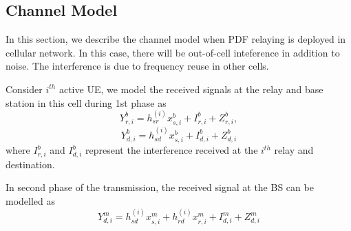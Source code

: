 \subsection{Channel Model}
In this section, we describe the channel model when PDF relaying is deployed in cellular network. In this case, there will be out-of-cell inteference in addition to noise. The interference is due to frequency reuse in other cells.
\par Consider $i^{th}$ active UE, we model the received signals at the relay and base station in this cell during 1st phase as
\begin{equation*}
Y_{r,i}^b = h^{(i)}_{sr}x_{s,i}^b + I_{r,i}^b + Z_{r,i}^b,
\end{equation*}
\begin{equation}
Y_{d,i}^b = h^{(i)}_{sd}x_{s,i}^b + I_{d,i}^b + Z_{d,i}^b
\end{equation}
where $I_{r,i}^b$ and $I_{d,i}^b$ represent the interference received at the $i^{th}$ relay and destination. 
\par 
In second phase of the transmission, the received signal at the BS can be modelled as 
\begin{equation}
Y_{d,i}^m = h^{(i)}_{sd}x_{s,i}^m + h^{(i)}_{rd}x_{r,i}^m+ I_{d,i}^m + Z_{d,i}^m
\end{equation}

